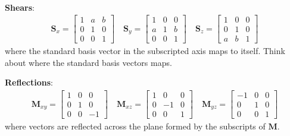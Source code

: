 \documentclass{article}
\begin{document}
\begin{minipage}[t]{126.1962963mm}
\begin{align*}
    \end{align*}
    \textbf{Shears}:
    \begin{align*}
        \symbf{S}_x =
        \begin{bmatrix}
            1 & a & b \\
            0 & 1 & 0 \\
            0 & 0 & 1
        \end{bmatrix}
        \quad \symbf{S}_y =
        \begin{bmatrix}
            1 & 0 & 0 \\
            a & 1 & b \\
            0 & 0 & 1
        \end{bmatrix}
        \quad \symbf{S}_z =
        \begin{bmatrix}
            1 & 0 & 0 \\
            0 & 1 & 0 \\
            a & b & 1
        \end{bmatrix}
    \end{align*}
    where the standard basis vector in the subscripted axis maps to itself.
    Think about where the standard basis vectors maps.

    \textbf{Reflections}:
    \begin{align*}
        \symbf{M}_{xy}=
        \begin{bmatrix}
            1 & 0 & 0  \\
            0 & 1 & 0  \\
            0 & 0 & -1
        \end{bmatrix}
        \quad \symbf{M}_{xz} =
        \begin{bmatrix}
            1 & 0  & 0 \\
            0 & -1 & 0 \\
            0 & 0  & 1
        \end{bmatrix}
        \quad \symbf{M}_{yz} =
        \begin{bmatrix}
            -1 & 0 & 0 \\
            0  & 1 & 0 \\
            0  & 0 & 1
        \end{bmatrix}
    \end{align*}
    where vectors are reflected across the plane formed by the subscripts of
    \(\symbf{M}\).


\end{minipage}
\end{document}
